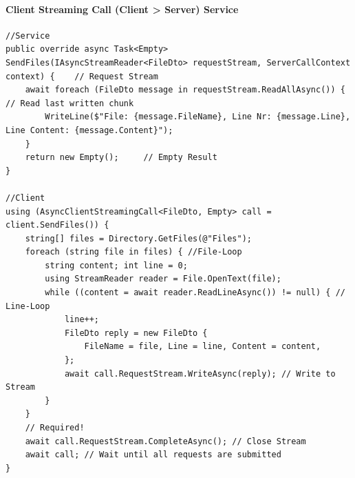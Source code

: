 \documentclass[
a4paper,
oneside,
10pt,
fleqn,
headsepline,
toc=listofnumbered, 
bibliography=totocnumbered]{scrartcl}
\begin{document}
\paragraph{Client Streaming Call (Client > Server) Service}
\begin{lstlisting}
//Service
public override async Task<Empty> SendFiles(IAsyncStreamReader<FileDto> requestStream, ServerCallContext context) {    // Request Stream
    await foreach (FileDto message in requestStream.ReadAllAsync()) {   // Read last written chunk
        WriteLine($"File: {message.FileName}, Line Nr: {message.Line}, Line Content: {message.Content}");
    }
    return new Empty();     // Empty Result
}

//Client
using (AsyncClientStreamingCall<FileDto, Empty> call = client.SendFiles()) {
    string[] files = Directory.GetFiles(@"Files");
    foreach (string file in files) { //File-Loop
        string content; int line = 0;
        using StreamReader reader = File.OpenText(file);
        while ((content = await reader.ReadLineAsync()) != null) { // Line-Loop
            line++;
            FileDto reply = new FileDto {
                FileName = file, Line = line, Content = content,
            };
            await call.RequestStream.WriteAsync(reply); // Write to Stream
        }
    }
    // Required!
    await call.RequestStream.CompleteAsync(); // Close Stream
    await call; // Wait until all requests are submitted
}
\end{lstlisting}
\end{document}
